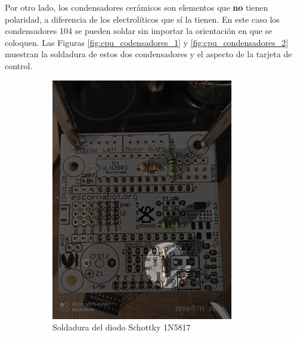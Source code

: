 \documentclass{article}
\begin{document}
Por otro lado, los condensadores cerámicos son elementos que \textbf{no} tienen polaridad, a diferencia de los electrolíticos que sí la tienen. En este caso los condensadores 104 se pueden soldar sin importar la orientación en que se coloquen. Las Figuras \ref{fig:cpu_codensadores_1} y \ref{fig:cpu_condensadores_2} muestran la soldadura de estos dos condensadores y el aspecto de la tarjeta de control.

\begin{figure}[H]
    \centering
    \begin{subfigure}[t]{0.3\textwidth}
        \centering
        \includegraphics[width=0.9\columnwidth, height=1.2\columnwidth]{images/CPU/cpu_diodo_1.png}
        \caption{Soldadura del diodo Schottky 1N5817}
        \label{fig:cpu_diodo_1}
    \end{subfigure}%
    \begin{subfigure}[t]{0.3\textwidth}
        \centering

\end{subfigure}
\end{figure}
\end{document}
